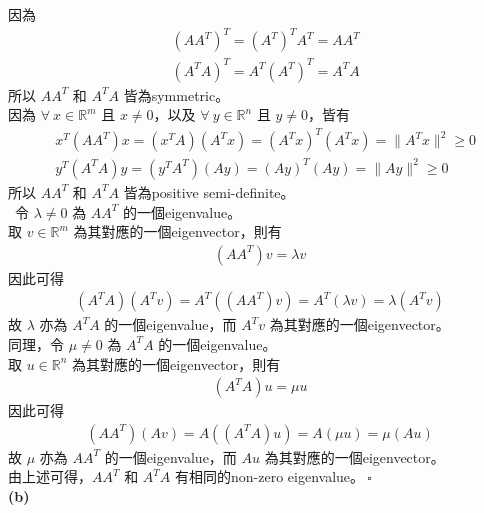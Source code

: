 \documentclass{article}
\begin{document}
\noindent
因為
\begin{align*}
    &(A A^T)^T = (A^T)^T A^T = A A^T\\
    &(A^T A)^T = A^T (A^T)^T = A^T A
\end{align*}
所以 $A A^T$ 和 $A^T A$ 皆為symmetric。\\
因為 $\forall\ x \in {\mathbb R}^m$ 且 $x \ne 0$，以及 $\forall\ y \in {\mathbb R}^n$ 且 $y \ne 0$，皆有
\begin{align*}
    &x^T (A A^T) x = (x^T A)(A^T x) = (A^T x)^T (A^T x) = \| A^T x \|^2 \ge 0\\
    &y^T (A^T A) y = (y^T A^T)(A y) = (A y)^T (A y) = \| A y \|^2 \ge 0
\end{align*}
所以 $A A^T$ 和 $A^T A$ 皆為positive semi-definite。\\\
令 $\lambda \ne 0$ 為 $A A^T$ 的一個eigenvalue。\\
取 $v \in {\mathbb R}^m$ 為其對應的一個eigenvector，則有
\begin{align*}
    (A A^T) v = \lambda v
\end{align*}
因此可得
\begin{align*}
    (A^T A) (A^T v) = A^T ((A A^T) v) = A^T (\lambda v) = \lambda (A^T v)
\end{align*}
故 $\lambda$ 亦為 $A^T A$ 的一個eigenvalue，而 $A^T v$ 為其對應的一個eigenvector。\\
同理，令 $\mu \ne 0$ 為 $A^T A$ 的一個eigenvalue。\\
取 $u \in {\mathbb R}^n$ 為其對應的一個eigenvector，則有
\begin{align*}
    (A^T A) u = \mu u
\end{align*}
因此可得
\begin{align*}
    (A A^T) (A v) = A ((A^T A) u) = A (\mu u) = \mu (A u)
\end{align*}
故 $\mu$ 亦為 $A A^T$ 的一個eigenvalue，而 $A u$ 為其對應的一個eigenvector。\\
由上述可得，$A A^T$ 和 $A^T A$ 有相同的non-zero eigenvalue。$\ \square$\\

\noindent
{\bf (b)}\\
\end{document}
